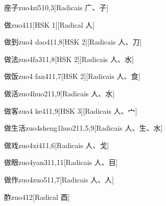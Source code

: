 \begin{entry}{座子}{zuo4zi5}{10,3}[Radicais ⼴、⼦]
\end{entry}

\begin{entry}{做}{zuo4}{11}[HSK 1][Radical ⼈]
\end{entry}

\begin{entry}{做到}{zuo4 dao4}{11,8}[HSK 2][Radicais ⼈、⼑]
\end{entry}

\begin{entry}{做法}{zuo4fa3}{11,8}[HSK 2][Radicais ⼈、⽔]
\end{entry}

\begin{entry}{做饭}{zuo4 fan4}{11,7}[HSK 2][Radicais ⼈、⾷]
\end{entry}

\begin{entry}{做活}{zuo4huo2}{11,9}[Radicais ⼈、⽔]
\end{entry}

\begin{entry}{做客}{zuo4 ke4}{11,9}[HSK 3][Radicais ⼈、⼧]
\end{entry}

\begin{entry}{做生活}{zuo4sheng1huo2}{11,5,9}[Radicais ⼈、⽣、⽔]
\end{entry}

\begin{entry}{做戏}{zuo4xi4}{11,6}[Radicais ⼈、⼽]
\end{entry}

\begin{entry}{做眼}{zuo4yan3}{11,11}[Radicais ⼈、⽬]
\end{entry}

\begin{entry}{做作}{zuo4zuo5}{11,7}[Radicais ⼈、⼈]
\end{entry}

\begin{entry}{酢}{zuo4}{12}[Radical ⾣]
\end{entry}


